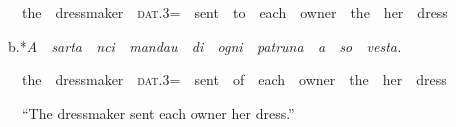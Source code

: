 \documentclass[output=paper,modfonts,nonflat]{langsci/langscibook}
\begin{document}
\begin{styleStandard}
\ \ \ \ the\ \ dressmaker\ \ \textsc{dat}.3=\ \ sent\ \ to\ \ each\ \ owner\ \ the\ \ her\ \ dress
\end{styleStandard}

\begin{styleStandard}
\ \ b.*\textit{A\ \ sarta\ \ nci\ \ mandau\ \ di\ \ ogni\ \ patruna\ \ a\ \ so\ \ vesta.}
\end{styleStandard}

\begin{styleStandard}
\ \ \ \ the\ \ dressmaker\ \ \textsc{dat}.3=\ \ sent\ \ of\ \ each\ \ owner\ \ the\ \ her\ \ dress
\end{styleStandard}

\begin{styleStandard}
\ \ \ \ “The dressmaker sent each owner her dress.”
\end{styleStandard}
\end{document}
